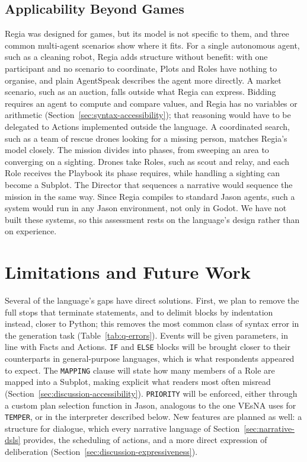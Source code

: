  
\subsection{Applicability Beyond Games}
\label{sec:beyond-games}
 
Regia was designed for games, but its model is not specific to them, and three common multi-agent scenarios show where it fits. For a single autonomous agent, such as a cleaning robot, Regia adds structure without benefit: with one participant and no scenario to coordinate, Plots and Roles have nothing to organise, and plain AgentSpeak describes the agent more directly. A market scenario, such as an auction, falls outside what Regia can express. Bidding requires an agent to compute and compare values, and Regia has no variables or arithmetic (Section~\ref{sec:syntax-accessibility}); that reasoning would have to be delegated to Actions implemented outside the language. A coordinated search, such as a team of rescue drones looking for a missing person, matches Regia's model closely. The mission divides into phases, from sweeping an area to converging on a sighting. Drones take Roles, such as scout and relay, and each Role receives the Playbook its phase requires, while handling a sighting can become a Subplot. The Director that sequences a narrative would sequence the mission in the same way. Since Regia compiles to standard Jason agents, such a system would run in any Jason environment, not only in Godot. We have not built these systems, so this assessment rests on the language's design rather than on experience.

\section{Limitations and Future Work}
\label{sec:limitations}
 
Several of the language's gaps have direct solutions. First, we plan to remove the full stops that terminate statements, and to delimit blocks by indentation instead, closer to Python; this removes the most common class of syntax error in the generation task (Table~\ref{tab:q-errors}). Events will be given parameters, in line with Facts and Actions. \lstinline|IF| and \lstinline|ELSE| blocks will be brought closer to their counterparts in general-purpose languages, which is what respondents appeared to expect. The \lstinline|MAPPING| clause will state how many members of a Role are mapped into a Subplot, making explicit what readers most often misread (Section~\ref{sec:discussion-accessibility}). \lstinline|PRIORITY| will be enforced, either through a custom plan selection function in Jason, analogous to the one VEsNA uses for \lstinline|TEMPER|, or in the interpreter described below. New features are planned as well: a structure for dialogue, which every narrative language of Section~\ref{sec:narrative-dsls} provides, the scheduling of actions, and a more direct expression of deliberation (Section~\ref{sec:discussion-expressiveness}).

